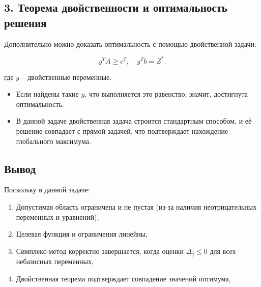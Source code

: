 \subsection*{3. Теорема двойственности и оптимальность решения}
Дополнительно можно доказать оптимальность с помощью двойственной задачи:

$$y^T A \geq c^T, \quad y^T b = Z^*.$$

где $y$ – двойственные переменные.

\begin{itemize}
    \item Если найдены такие $y$, что выполняется это равенство, значит, достигнута оптимальность.
    \item В данной задаче двойственная задача строится стандартным способом, и её решение совпадает с прямой задачей, что подтверждает нахождение глобального максимума.
\end{itemize}

\subsection*{Вывод}
Поскольку в данной задаче:
\begin{enumerate}
    \item Допустимая область ограничена и не пустая (из-за наличия неотрицательных переменных и уравнений),
    \item Целевая функция и ограничения линейны,
    \item Симплекс-метод корректно завершается, когда оценки $\Delta_j \leq 0$ для всех небазисных переменных,
    \item Двойственная теорема подтверждает совпадение значений оптимума,
\end{enumerate}
